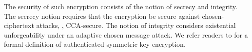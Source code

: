 The security of such encryption consists of the notion of secrecy and integrity. The secrecy notion requires that the encryption be secure against chosen-ciphertext attacks, \ie, CCA-secure. The notion of integrity considers existential unforgeability under an adaptive chosen message attack. We refer readers to \cite{KatzLindell2014} for a formal definition of authenticated symmetric-key encryption. 




